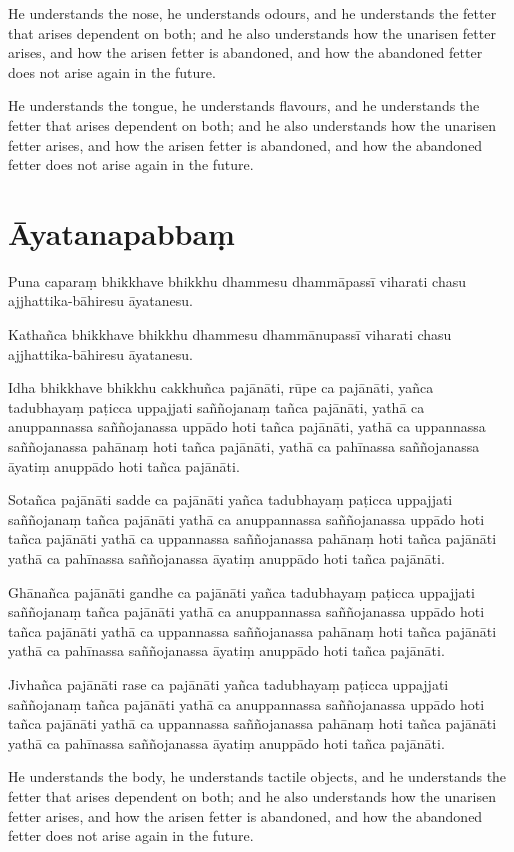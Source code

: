 He understands the nose, he understands odours, and he understands the fetter
that arises dependent on both; and he also understands how the unarisen fetter
arises, and how the arisen fetter is abandoned, and how the abandoned fetter
does not arise again in the future.

He understands the tongue, he understands flavours, and he understands the
fetter that arises dependent on both; and he also understands how the unarisen
fetter arises, and how the arisen fetter is abandoned, and how the abandoned
fetter does not arise again in the future.

\paliPage
\section*{Āyatanapabbaṃ}

Puna caparaṃ bhikkhave bhikkhu dhammesu dhammāpassī viharati chasu
ajjhattika-bāhiresu āyatanesu.

Kathañca bhikkhave bhikkhu dhammesu dhammānupassī viharati chasu
ajjhattika-bāhiresu āyatanesu.

Idha bhikkhave bhikkhu
cakkhuñca pajānāti,
rūpe ca pajānāti,
yañca tadubhayaṃ paṭicca uppajjati saññojanaṃ tañca pajānāti,
yathā ca anuppannassa saññojanassa uppādo hoti tañca pajānāti,
yathā ca uppannassa saññojanassa pahānaṃ hoti tañca pajānāti,
yathā ca pahīnassa saññojanassa āyatiṃ anuppādo hoti tañca pajānāti.

Sotañca pajānāti sadde ca pajānāti yañca tadubhayaṃ paṭicca uppajjati saññojanaṃ
tañca pajānāti yathā ca anuppannassa saññojanassa uppādo hoti tañca pajānāti
yathā ca uppannassa saññojanassa pahānaṃ hoti tañca pajānāti yathā ca pahīnassa
saññojanassa āyatiṃ anuppādo hoti tañca pajānāti.

Ghānañca pajānāti gandhe ca pajānāti yañca tadubhayaṃ paṭicca uppajjati
saññojanaṃ tañca pajānāti yathā ca anuppannassa saññojanassa uppādo hoti tañca
pajānāti yathā ca uppannassa saññojanassa pahānaṃ hoti tañca pajānāti yathā ca
pahīnassa saññojanassa āyatiṃ anuppādo hoti tañca pajānāti.

Jivhañca pajānāti rase ca pajānāti yañca tadubhayaṃ paṭicca uppajjati saññojanaṃ
tañca pajānāti yathā ca anuppannassa saññojanassa uppādo hoti tañca pajānāti
yathā ca uppannassa saññojanassa pahānaṃ hoti tañca pajānāti yathā ca pahīnassa
saññojanassa āyatiṃ anuppādo hoti tañca pajānāti.

\englishPage

He understands the body, he understands tactile objects, and he understands the
fetter that arises dependent on both; and he also understands how the unarisen
fetter arises, and how the arisen fetter is abandoned, and how the abandoned
fetter does not arise again in the future.

